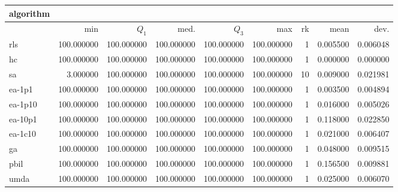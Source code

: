 \begin{center}
\begin{tabular}{@{}l*{5}{>{{}}N{3}{0}}>{{}}N{2}{0}N{1}{3}N{1}{3}@{}}
\toprule
{algorithm} &  &  \\
\midrule
& {min} & {$Q_1$} & {med.} & {$Q_3$} & {max} & {rk} & {mean} & {dev.} \\
\midrule
rls & {\color{blue}} 100.000000 & {\color{blue}} 100.000000 & {\color{blue}} 100.000000 & {\color{blue}} 100.000000 & {\color{blue}} 100.000000 & 1 & 0.005500 & 0.006048 \\
 hc & {\color{blue}} 100.000000 & {\color{blue}} 100.000000 & {\color{blue}} 100.000000 & {\color{blue}} 100.000000 & {\color{blue}} 100.000000 & 1 & 0.000000 & 0.000000 \\
 sa & 3.000000 & {\color{blue}} 100.000000 & {\color{blue}} 100.000000 & {\color{blue}} 100.000000 & {\color{blue}} 100.000000 & 10 & 0.009000 & 0.021981 \\
 ea-1p1 & {\color{blue}} 100.000000 & {\color{blue}} 100.000000 & {\color{blue}} 100.000000 & {\color{blue}} 100.000000 & {\color{blue}} 100.000000 & 1 & 0.003500 & 0.004894 \\
 ea-1p10 & {\color{blue}} 100.000000 & {\color{blue}} 100.000000 & {\color{blue}} 100.000000 & {\color{blue}} 100.000000 & {\color{blue}} 100.000000 & 1 & 0.016000 & 0.005026 \\
 ea-10p1 & {\color{blue}} 100.000000 & {\color{blue}} 100.000000 & {\color{blue}} 100.000000 & {\color{blue}} 100.000000 & {\color{blue}} 100.000000 & 1 & 0.118000 & 0.022850 \\
 ea-1c10 & {\color{blue}} 100.000000 & {\color{blue}} 100.000000 & {\color{blue}} 100.000000 & {\color{blue}} 100.000000 & {\color{blue}} 100.000000 & 1 & 0.021000 & 0.006407 \\
 ga & {\color{blue}} 100.000000 & {\color{blue}} 100.000000 & {\color{blue}} 100.000000 & {\color{blue}} 100.000000 & {\color{blue}} 100.000000 & 1 & 0.048000 & 0.009515 \\
 pbil & {\color{blue}} 100.000000 & {\color{blue}} 100.000000 & {\color{blue}} 100.000000 & {\color{blue}} 100.000000 & {\color{blue}} 100.000000 & 1 & 0.156500 & 0.009881 \\
 umda & {\color{blue}} 100.000000 & {\color{blue}} 100.000000 & {\color{blue}} 100.000000 & {\color{blue}} 100.000000 & {\color{blue}} 100.000000 & 1 & 0.025000 & 0.006070 \\
 \bottomrule
\end{tabular}
\end{center}

